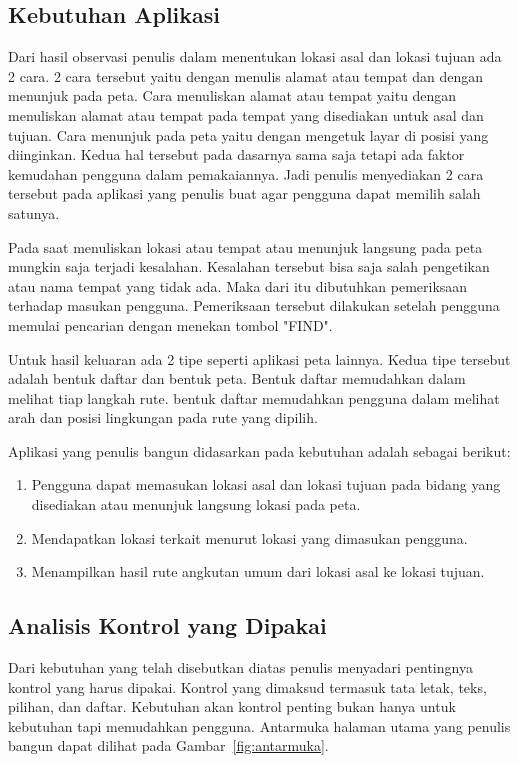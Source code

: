 \subsection{Kebutuhan Aplikasi}
\label{lab:Kebutuhan Aplikasi}
\hspace{0.5cm} Dari hasil observasi penulis dalam menentukan lokasi asal dan lokasi tujuan ada 2 cara. 2 cara tersebut yaitu dengan menulis alamat atau tempat dan dengan menunjuk pada peta. Cara menuliskan alamat atau tempat yaitu dengan menuliskan alamat atau tempat pada tempat yang disediakan untuk asal dan tujuan. Cara menunjuk pada peta yaitu dengan mengetuk layar di posisi yang diinginkan. Kedua hal tersebut pada dasarnya sama saja tetapi ada faktor kemudahan pengguna dalam pemakaiannya. Jadi penulis menyediakan 2 cara tersebut pada aplikasi yang penulis buat agar pengguna dapat memilih salah satunya.

\hspace{0.5cm} Pada saat menuliskan lokasi atau tempat atau menunjuk langsung pada peta mungkin saja terjadi kesalahan. Kesalahan tersebut bisa saja salah pengetikan atau nama tempat yang tidak ada. Maka dari itu dibutuhkan pemeriksaan terhadap masukan pengguna. Pemeriksaan tersebut dilakukan setelah pengguna memulai pencarian dengan menekan tombol "FIND".

\hspace{0.5cm} Untuk hasil keluaran ada 2 tipe seperti aplikasi peta lainnya. Kedua tipe tersebut adalah bentuk daftar dan bentuk peta. Bentuk daftar memudahkan dalam melihat tiap langkah rute. bentuk daftar memudahkan pengguna dalam melihat arah dan posisi lingkungan pada rute yang dipilih.

\hspace{0.5cm} Aplikasi yang penulis bangun didasarkan pada kebutuhan adalah sebagai berikut:
\begin{enumerate}
	\item Pengguna dapat memasukan lokasi asal dan lokasi tujuan pada bidang yang disediakan atau menunjuk langsung lokasi pada peta.
	\item Mendapatkan lokasi terkait menurut lokasi yang dimasukan pengguna.
	\item Menampilkan hasil rute angkutan umum dari lokasi asal ke lokasi tujuan.
\end{enumerate}

\subsection{Analisis Kontrol yang Dipakai}
\label{lab:Analisis Kontrol yang Dipakai}
\hspace{0.5cm} Dari kebutuhan yang telah disebutkan diatas penulis menyadari pentingnya kontrol yang harus dipakai. Kontrol yang dimaksud termasuk tata letak, teks, pilihan, dan daftar. Kebutuhan akan kontrol penting bukan hanya untuk kebutuhan tapi memudahkan pengguna. Antarmuka halaman utama yang penulis bangun dapat dilihat pada Gambar~\ref{fig:antarmuka}. 

